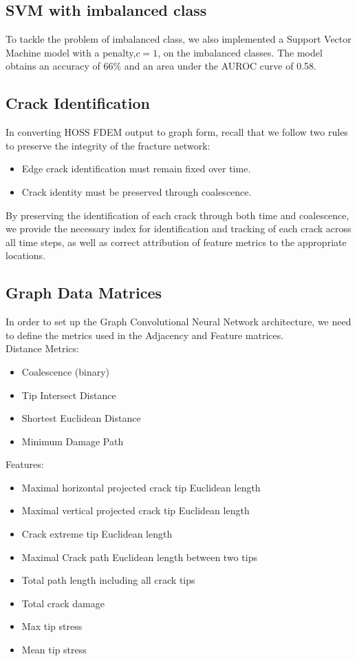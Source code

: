 \subsection{SVM with imbalanced class}
To tackle the problem of imbalanced class, we also implemented a Support Vector Machine model with a penalty,$c=1$, on the imbalanced classes. The model obtains an accuracy of 66\% and an area under the AUROC curve of 0.58.



\iffalse
\subsection{Crack Identification}
In converting HOSS FDEM output to graph form, recall that we follow two rules to preserve the integrity of the fracture network:
\begin{itemize}
	\item Edge crack identification must remain fixed over time.
 	\item Crack identity must be preserved through coalescence.
\end{itemize} 
By preserving the identification of each crack through both time and coalescence, we provide the necessary index for identification and tracking of each crack across all time steps, as well as correct attribution of feature metrics to the appropriate locations.
          
\subsection{Graph Data Matrices}
In order to set up the Graph Convolutional Neural Network architecture, we need to define the metrics used in the Adjacency and Feature matrices.\\
Distance Metrics:
        \begin{itemize}
        \item Coalescence (binary)
        \item Tip Intersect Distance  
        \item Shortest Euclidean Distance
        \item Minimum Damage Path
        \end{itemize}       
Features:
    \begin{itemize}
	\item Maximal horizontal projected crack tip Euclidean length
	\item Maximal vertical projected crack tip Euclidean length 
	\item Crack extreme tip Euclidean length
    \item Maximal Crack path Euclidean length between two tips
    \item Total path length including all crack tips
    \item Total crack damage
    \item Max tip stress
    \item Mean tip stress
	\end{itemize}
    
